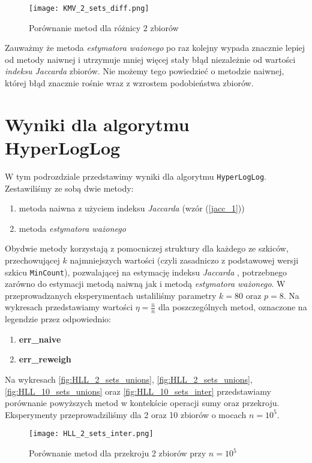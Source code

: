 \begin{figure}[h!]
    \texttt{[image: KMV\_2\_sets\_diff.png]}
    \centering
    \caption{Porównanie metod dla różnicy 2 zbiorów}
    \label{fig:KMV_2_sets_diff}
\end{figure}

Zauważmy że metoda \textit{estymatora ważonego} po raz kolejny wypada znacznie lepiej od metody naiwnej i utrzymuje mniej więcej stały błąd niezależnie od wartości \textit{indeksu Jaccarda} zbiorów. Nie możemy tego powiedzieć o metodzie naiwnej, której błąd znacznie rośnie wraz z wzrostem podobieństwa zbiorów.

\newpage
\section{Wyniki dla algorytmu HyperLogLog}
W tym podrozdziale przedstawimy wyniki dla algorytmu \texttt{HyperLogLog}. Zestawiliśmy ze sobą dwie metody:
\begin{enumerate}
	\item metoda naiwna z użyciem indeksu \textit{Jaccarda} (wzór (\ref{jacc_1}))
	\item metoda \textit{estymatora ważonego}
\end{enumerate}
Obydwie metody korzystają z pomocniczej struktury dla każdego ze szkiców, przechowującej $k$ najmniejszych wartości (czyli zasadniczo z podstawowej wersji szkicu \texttt{MinCount}), pozwalającej na estymację indeksu \textit{Jaccarda} \cite{adroll}, potrzebnego zarówno do estymacji metodą naiwną jak i metodą \textit{estymatora ważonego}. W przeprowadzanych eksperymentach ustaliliśmy parametry $k = 80$ oraz $p = 8$.
Na wykresach przedstawiamy wartości $\eta = \frac{\hat{n}}{n}$ dla poszczególnych metod, oznaczone na legendzie przez odpowiednio:
\begin{enumerate}
	\item \textbf{err\_naive}
	\item \textbf{err\_reweigh}
\end{enumerate}

Na wykresach \ref{fig:HLL_2_sets_unions}, \ref{fig:HLL_2_sets_unions}, \ref{fig:HLL_10_sets_unions} oraz \ref{fig:HLL_10_sets_inter} przedstawiamy porównanie powyższych metod w kontekście operacji sumy oraz przekroju. Eksperymenty przeprowadziliśmy dla 2 oraz 10 zbiorów o mocach $n=10^5$.

\begin{figure}[h!]
	\texttt{[image: HLL\_2\_sets\_inter.png]}
	\centering
	\caption{Porównanie metod dla przekroju 2 zbiorów przy $n=10^5$}
	\label{fig:HLL_2_sets_inter}
\end{figure}

